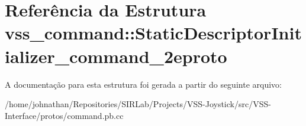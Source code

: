 \hypertarget{structvss__command_1_1StaticDescriptorInitializer__command__2eproto}{}\section{Referência da Estrutura vss\+\_\+command\+:\+:Static\+Descriptor\+Initializer\+\_\+command\+\_\+2eproto}
\label{structvss__command_1_1StaticDescriptorInitializer__command__2eproto}


A documentação para esta estrutura foi gerada a partir do seguinte arquivo\+:\begin{DoxyCompactItemize}
\item 
/home/johnathan/\+Repositories/\+S\+I\+R\+Lab/\+Projects/\+V\+S\+S-\/\+Joystick/src/\+V\+S\+S-\/\+Interface/protos/command.\+pb.\+cc\end{DoxyCompactItemize}
